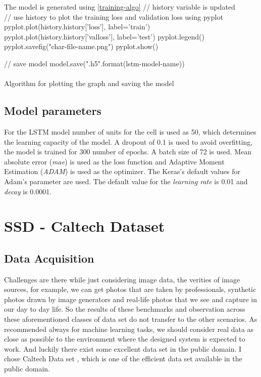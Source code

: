 \begin{algorithm}[H]
\SetAlgoLined
{}
 The model is generated using \ref{training-algo} \;
 // history variable is updated \\
 // use history to plot the training loss and validation loss using pyplot\;
 pyplot.plot(history.history['loss'], label='train')\;
 pyplot.plot(history.history['val\textunderscore loss'], label='test')\;
 pyplot.legend()\;
 pyplot.savefig("char-file-name.png")\;
 pyplot.show()\;

// save model\;
model.save("{}.h5".format(lstm-model-name)) \;
~\\
~\\
 \caption{Algorithm for plotting the graph and saving the model} 
\end{algorithm}

\subsection{Model parameters}
For the LSTM model number of units for the cell is used as 50, which determines the learning capacity of the model. A dropout of 0.1 is used to avoid overfitting, the model is trained for  300 number of epochs. A batch size of 72 is used. Mean absolute error (\textit{mae}) is used as the loss function and Adaptive Moment Estimation (\textit{ADAM}) is used as the optimizer. The Keras's default values for Adam's parameter are used. The default value for the \textit{learning rate} is 0.01 and \textit{decay} is 0.0001. 

\section{SSD - Caltech Dataset}

\subsection{Data Acquisition}
Challenges are there while just considering image data, the verities of image sources, for example, we can get photos that are taken by professionals, synthetic photos drawn by image generators and real-life photos that we see and capture in our day to day life. So the results of these benchmarks and 
observation across these aforementioned classes of data set do not transfer to the other scenarios.
As recommended always for machine learning tasks, we should consider real data as close as possible to the environment where the designed system is expected to work. And luckily there exist some excellent data set in the public domain. I chose Caltech Data set \cite{dollar2009pedestrian}, which is one of the efficient data set available in the public domain. 

